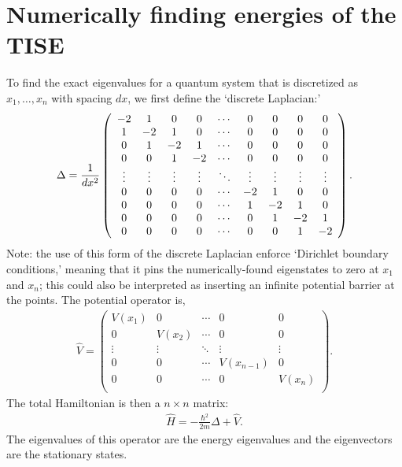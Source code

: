 \documentclass[10pt]{article}
\newcommand{\1}{\mathbf 1}
\begin{document}




\section*{Numerically finding energies of the TISE}

To find the exact eigenvalues for a quantum system that is discretized as $x_1,\dots,x_n$ with spacing $dx$, we first define the `discrete Laplacian:'
\begin{align}
	\Delta = 
	\frac{1}{dx^2}
	\left(
		\begin{array}[]{cccccccccc}
			-2 & 1 & 0 & 0 &\cdots & 0 & 0 & 0 & 0\\
			1 & -2 & 1 & 0&\cdots & 0 & 0 & 0 & 0\\
			0 & 1 & -2 & 1 &\cdots & 0 & 0 & 0 & 0\\
			0 & 0 & 1 & -2 & \cdots & 0 & 0 & 0 & 0 \\
			\vdots & \vdots & \vdots & \vdots & \ddots & \vdots & \vdots & \vdots & \vdots \\
			0 & 0 & 0 & 0 & \cdots & -2 & 1 & 0 & 0 \\
			0 & 0 & 0 & 0 & \cdots & 1 & -2 & 1 & 0 \\
			0 & 0 & 0 & 0 & \cdots & 0 & 1 & -2 & 1 \\
			0 & 0 & 0 & 0 & \cdots & 0 & 0 & 1 & -2 \\
		\end{array}
	\right).
\end{align}
Note: the use of this form of the discrete Laplacian enforce `Dirichlet boundary conditions,' meaning that it pins the numerically-found eigenstates to zero at $x_1$ and $x_n$; this could also be interpreted as inserting an infinite potential barrier at the points.
The potential operator is,
\begin{align}
	\hat V
	=
	\left(
		\begin{array}{ccccc}
			V(x_1) & 0 & \cdots & 0 & 0\\
			0 & V(x_2)  & \cdots & 0 & 0\\
			\vdots & \vdots  & \ddots & \vdots & \vdots\\
			0 & 0  & \cdots & V(x_{n-1}) & 0\\
			0 & 0  & \cdots & 0 & V(x_n)\\
		\end{array}
	\right).
\end{align}
The total Hamiltonian is then a $n \times n$ matrix:
\begin{align}
	\hat H = -\frac{\hbar^2}{2m} \Delta + \hat V.
\end{align}
The eigenvalues of this operator are the energy eigenvalues and the eigenvectors are the stationary states.
\end{document}
